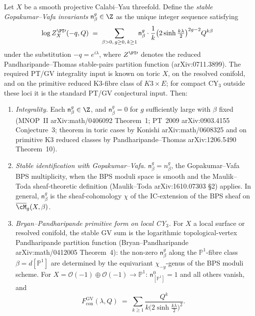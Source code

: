 \begin{theorem}
\label{thm:stable-gv-pt-equivalence}
Let $X$ be a smooth projective Calabi--Yau threefold. Define the
\emph{stable Gopakumar--Vafa invariants} $\mathsf{n}^{g}_\beta \in \Z$
as the unique integer sequence satisfying
\[
 \log Z^{\PT\prime}_X(-q, Q)
 \;=\;
 \sum_{\beta > 0,\, g \geq 0,\, k \geq 1}
 \mathsf{n}^{g}_\beta \cdot \frac{1}{k}
 \bigl(2 \sinh\tfrac{k \lambda}{2}\bigr)^{2g - 2} Q^{k\beta}
\]
under the substitution $-q = e^{i\lambda}$, where $Z^{\PT\prime}$
denotes the reduced Pandharipande--Thomas stable-pairs partition
function (\textup{arXiv:0711.3899}). The required PT/GV integrality
input is known on toric $X$, on the resolved conifold, and on the
primitive reduced K3-fibre class of $K3 \times E$; for compact
CY$_3$ outside these loci it is the standard PT/GV conjectural input.
Then:
\begin{enumerate}[label=\textup{(\roman*)}]
\item \emph{Integrality.} Each $\mathsf{n}^{g}_\beta \in \Z$, and
 $\mathsf{n}^{g}_\beta = 0$ for $g$ sufficiently large with $\beta$
 fixed (MNOP~II \textup{arXiv:math/0406092} Theorem~1; PT~2009
 \textup{arXiv:0903.4155} Conjecture~3; theorem in toric cases by
 Konishi \textup{arXiv:math/0608325} and on primitive K3 reduced
 classes by Pandharipande--Thomas \textup{arXiv:1206.5490}
 Theorem~10).
\item \emph{Stable identification with Gopakumar--Vafa.}
 $\mathsf{n}^{g}_\beta = n^{g}_\beta$, the Gopakumar--Vafa BPS
 multiplicity, when the BPS moduli space is smooth and the
 Maulik--Toda sheaf-theoretic definition (Maulik--Toda
 \textup{arXiv:1610.07303} \S2) applies. In general,
 $\mathsf{n}^{g}_\beta$ is the sheaf-cohomology $\chi$ of the
 $\mathrm{IC}$-extension of the BPS sheaf on $\overline{\cM}_g(X,
 \beta)$.
\item \emph{Bryan--Pandharipande primitive form on local
 CY$_3$.} For $X$ a local surface or resolved conifold, the stable
 GV sum is the logarithmic topological-vertex Pandharipande partition
 function (Bryan--Pandharipande \textup{arXiv:math/0412005}
 Theorem~4): the non-zero $\mathsf{n}^{g}_\beta$ along the
 $\mathbb{P}^1$-fibre class $\beta = d[\mathbb{P}^1]$ are determined
 by the equivariant $\chi_{-y}$-genus of the BPS moduli scheme. For
 $X = \mathcal{O}(-1) \oplus \mathcal{O}(-1) \to \mathbb{P}^1$:
 $\mathsf{n}^{0}_{[\mathbb{P}^{1}]} = 1$ and all others vanish, and
 \[
 F^{\mathrm{GV}}_{\mathrm{con}}(\lambda, Q)
 \;=\;
 \sum_{k \geq 1} \frac{Q^{k}}{k \bigl(2\sinh\tfrac{k\lambda}{2}\bigr)^{2}}.
 \]
\end{enumerate}
\end{theorem}

